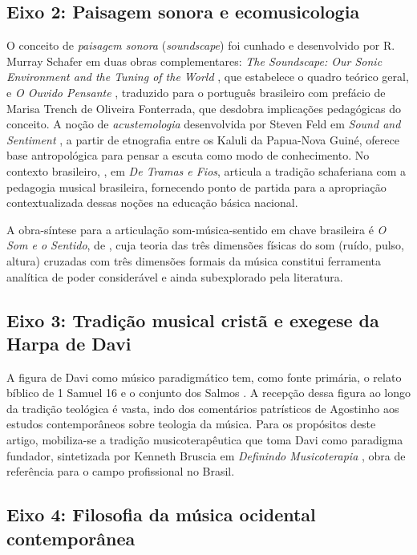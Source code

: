 \documentclass[12pt,a4paper]{article}
\begin{document}
\subsection{Eixo 2: Paisagem sonora e ecomusicologia}

O conceito de \textit{paisagem sonora} (\textit{soundscape}) foi cunhado e desenvolvido por R. Murray Schafer em duas obras complementares: \textit{The Soundscape: Our Sonic Environment and the Tuning of the World} \citep{Schafer1994}, que estabelece o quadro teórico geral, e \textit{O Ouvido Pensante} \citep{Schafer1991}, traduzido para o português brasileiro com prefácio de Marisa Trench de Oliveira Fonterrada, que desdobra implicações pedagógicas do conceito. A noção de \textit{acustemologia} desenvolvida por Steven Feld em \textit{Sound and Sentiment} \citep{Feld1982}, a partir de etnografia entre os Kaluli da Papua-Nova Guiné, oferece base antropológica para pensar a escuta como modo de conhecimento. No contexto brasileiro, \citet{Fonterrada2008}, em \textit{De Tramas e Fios}, articula a tradição schaferiana com a pedagogia musical brasileira, fornecendo ponto de partida para a apropriação contextualizada dessas noções na educação básica nacional.

A obra-síntese para a articulação som-música-sentido em chave brasileira é \textit{O Som e o Sentido}, de \citet{Wisnik1989}, cuja teoria das três dimensões físicas do som (ruído, pulso, altura) cruzadas com três dimensões formais da música constitui ferramenta analítica de poder considerável e ainda subexplorado pela literatura.

\subsection{Eixo 3: Tradição musical cristã e exegese da Harpa de Davi}

A figura de Davi como músico paradigmático tem, como fonte primária, o relato bíblico de 1 Samuel 16 e o conjunto dos Salmos \citep{Biblia1993}. A recepção dessa figura ao longo da tradição teológica é vasta, indo dos comentários patrísticos de Agostinho aos estudos contemporâneos sobre teologia da música. Para os propósitos deste artigo, mobiliza-se a tradição musicoterapêutica que toma Davi como paradigma fundador, sintetizada por Kenneth Bruscia em \textit{Definindo Musicoterapia} \citep{Bruscia2000}, obra de referência para o campo profissional no Brasil.

\subsection{Eixo 4: Filosofia da música ocidental contemporânea}
\end{document}
